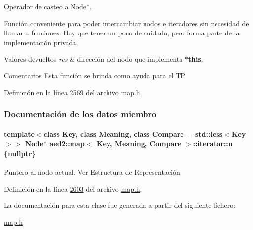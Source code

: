 Operador de casteo a Node$\ast$. 

Función conveniente para poder intercambiar nodos e iteradores sin necesidad de llamar a funciones. Hay que tener un poco de cuidado, pero forma parte de la implementación privada.


\begin{DoxyRetVals}{Valores devueltos}
{\em res} & dirección del nodo que implementa {\bfseries $\ast$this}.\\
\hline
\end{DoxyRetVals}
\begin{DoxyRemark}{Comentarios}
Esta función se brinda como ayuda para el TP 
\end{DoxyRemark}


Definición en la línea \hyperlink{map_8h_source_l02569}{2569} del archivo \hyperlink{map_8h_source}{map.\+h}.



\subsubsection{Documentación de los datos miembro}
\paragraph[{\texorpdfstring{n}{n}}]{\setlength{\rightskip}{0pt plus 5cm}template$<$class Key, class Meaning, class Compare = std\+::less$<$\+Key$>$$>$ Node$\ast$ {\bf aed2\+::map}$<$ Key, Meaning, Compare $>$\+::iterator\+::n \{nullptr\}\hspace{0.3cm}{\ttfamily [private]}}\hypertarget{classaed2_1_1map_1_1iterator_adf8633ef71bb6c1fc01c0abe8728fd93_adf8633ef71bb6c1fc01c0abe8728fd93}{}\label{classaed2_1_1map_1_1iterator_adf8633ef71bb6c1fc01c0abe8728fd93_adf8633ef71bb6c1fc01c0abe8728fd93}


Puntero al nodo actual. Ver Estructura de Representación. 



Definición en la línea \hyperlink{map_8h_source_l02603}{2603} del archivo \hyperlink{map_8h_source}{map.\+h}.



La documentación para esta clase fue generada a partir del siguiente fichero\+:\begin{DoxyCompactItemize}
\item 
\hyperlink{map_8h}{map.\+h}\end{DoxyCompactItemize}
